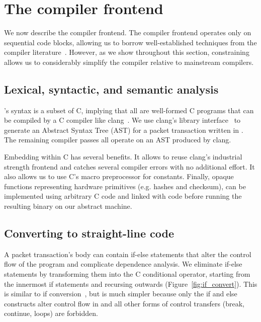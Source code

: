 \section{The \pktlanguage compiler frontend}

We now describe the \pktlanguage compiler frontend. The compiler frontend
operates only on sequential code blocks, allowing us to borrow well-established
techniques from the compiler literature~\cite{muchnik}. However, as we show
throughout this section, constraining \pktlanguage allows us to considerably
simplify the compiler relative to mainstream compilers.

\subsection{Lexical, syntactic, and semantic analysis}
\pktlanguage's syntax is a subset of C, implying that all \pktlanguage are
well-formed C programs that can be compiled by a C compiler like
clang~\cite{clang}. We use clang's library interface~\cite{libclang} to
generate an Abstract Syntax Tree (AST) for a packet transaction written in
\pktlanguage. The remaining compiler passes all operate on an AST produced by
clang.

Embedding \pktlanguage within C has several benefits. It allows to reuse
clang's industrial strength frontend and catches several compiler errors with
no additional effort.  It also allows us to use C's macro preprocessor for
constants. Finally, opaque functions representing hardware primitives (e.g.
hashes and checksum), can be implemented using arbitrary C code and linked with
\pktlanguage code before running the resulting binary on our abstract machine.

\subsection{Converting to straight-line code}
A packet transaction's body can contain if-else statements that alter the
control flow of the program and complicate dependence analysis. We eliminate
if-else statements by transforming them into the C conditional operator,
starting from the innermost if statements and recursing outwards
(Figure~\ref{fig:if_convert}). This is similar to if
conversion~\cite{allen_if_conversion}, but is much simpler because only the if
and else constructs alter control flow in \pktlanguage and all other forms of
control transfers (break, continue, loops) are forbidden.

